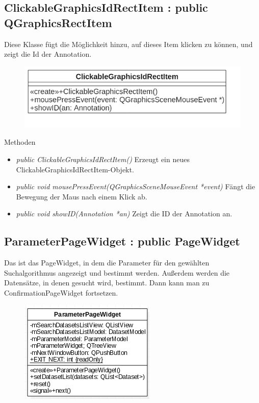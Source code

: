 \subsection*{ClickableGraphicsIdRectItem : public QGraphicsRectItem}
Diese Klasse fügt die Möglichkeit hinzu, auf dieses Item klicken zu können, und zeigt die Id der Annotation.

\begin{figure}[H]
	\centering
	\includegraphics[scale=0.5]{img/Klassendiagramm/Klassen/View/ClickableGraphicsIdRectItem}
	\label{fig:clickableGraphicsIdRectItem}
\end{figure}

Methoden
\begin{itemize}
	\item\textit{public ClickableGraphicsIdRectItem()}
	Erzeugt ein neues ClickableGraphicsIdRectItem-Objekt.
	\item\textit{public void mousePressEvent(QGraphicsSceneMouseEvent *event)}
	Fängt die Bewegung der Maus nach einem Klick ab.
	\item\textit{public void showID(Annotation *an)}
	Zeigt die ID der Annotation an.
\end{itemize}

\subsection*{ParameterPageWidget : public PageWidget}
Das ist das PageWidget, in dem die Parameter für den gewählten Suchalgorithmus angezeigt und bestimmt werden. Außerdem werden die Datensätze, in denen gesucht wird, bestimmt. Dann kann man zu ConfirmationPageWidget fortsetzen.

\begin{figure}[H]
	\centering
	\includegraphics[scale=0.5]{img/Klassendiagramm/Klassen/View/ParameterPageWidget}
	\label{fig:parameterPageWidget}
\end{figure}

